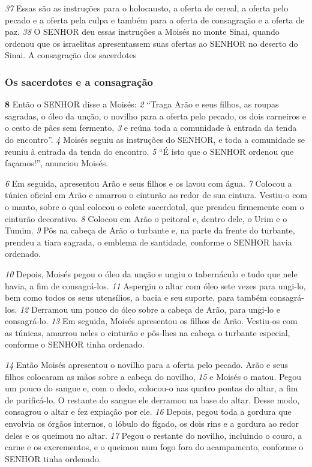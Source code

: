\bigskip
\textit{\tiny 37}
Essas são as instruções para o holocausto, a oferta de cereal, a oferta pelo
pecado e a oferta pela culpa e também para a oferta de consagração e a oferta de
paz. 
\textit{\tiny 38}
O SENHOR deu essas instruções a Moisés no monte Sinai, quando ordenou
que os israelitas apresentassem suas ofertas ao SENHOR no deserto do Sinai.
A consagração dos sacerdotes
   
\bigskip
\subsubsection*{Os sacerdotes e a consagração}  
\textbf{\large 8} Então o SENHOR disse a Moisés: 
\textit{\tiny 2} 
“Traga Arão e seus filhos, as roupas sagradas,
o óleo da unção, o novilho para a oferta pelo pecado, os dois carneiros e o cesto de
pães sem fermento, 
\textit{\tiny 3} 
e reúna toda a comunidade à entrada da tenda do encontro”. 
\textit{\tiny 4} 
Moisés   seguiu as instruções do SENHOR, e toda a comunidade se reuniu à
entrada da tenda do encontro. 
\textit{\tiny 5} 
“É isto que o SENHOR ordenou que façamos!”,
anunciou Moisés. 

\smallskip
\textit{\tiny 6} 
Em seguida, apresentou Arão e seus filhos e os lavou com água. 
\textit{\tiny 7} 
Colocou a túnica oficial em Arão e amarrou o cinturão ao redor de sua cintura.
Vestiu-o com o manto, sobre o qual colocou o colete sacerdotal, que prendeu
firmemente com o cinturão decorativo. 
\textit{\tiny 8} 
Colocou em Arão o peitoral e, dentro
dele, o Urim e o Tumim. 
\textit{\tiny 9} 
Pôs na cabeça de Arão o turbante e, na parte da frente
do turbante, prendeu a tiara sagrada, o emblema de santidade, conforme o
SENHOR havia ordenado.   

\smallskip
\textit{\tiny 10}
Depois, Moisés pegou o óleo da unção e ungiu o tabernáculo e tudo que nele
havia, a fim de consagrá-los. 
\textit{\tiny 11}
Aspergiu o altar com óleo sete vezes para ungi-lo,
bem como todos os seus utensílios, a bacia e seu suporte, para também consagrá-
los. 
\textit{\tiny 12}
Derramou um pouco do óleo sobre a cabeça de Arão, para ungi-lo e
consagrá-lo. 
\textit{\tiny 13}
Em seguida, Moisés apresentou os filhos de Arão. Vestiu-os com as
túnicas, amarrou neles o cinturão e pôs-lhes na cabeça o turbante especial,
conforme o SENHOR tinha ordenado.
   
\smallskip
\textit{\tiny 14}
Então Moisés apresentou o novilho para a oferta pelo pecado. Arão e seus
filhos colocaram as mãos sobre a cabeça do novilho, 
\textit{\tiny 15}
e Moisés o matou. Pegou
um pouco do sangue e, com o dedo, colocou-o nas quatro pontas do altar, a fim de
purificá-lo. O restante do sangue ele derramou na base do altar. Desse modo,
consagrou o altar e fez expiação por ele.
\textit{\tiny 16}
Depois, pegou toda a gordura que
envolvia os órgãos internos, o lóbulo do fígado, os dois rins e a gordura ao redor
deles e os queimou no altar. 
\textit{\tiny 17}
Pegou o restante do novilho, incluindo o couro, a
carne e os excrementos, e o queimou num fogo fora do acampamento, conforme
o SENHOR tinha ordenado.
   
